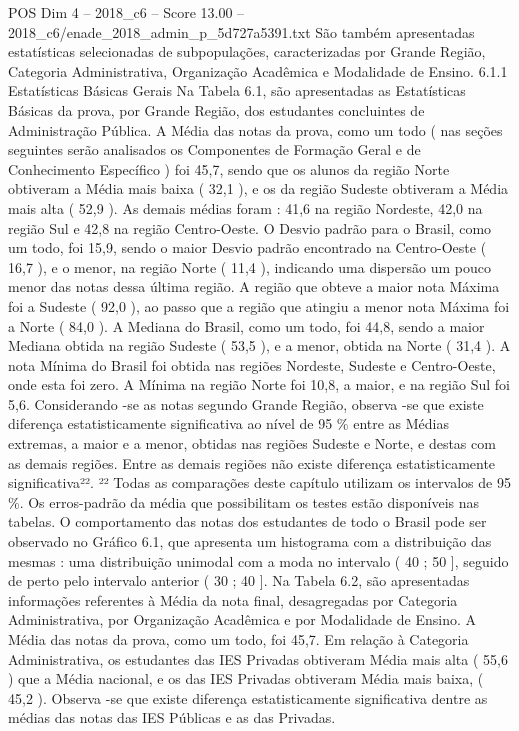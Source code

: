 \begin{textsample}{POS Dim 4 – 2018\_c6 – Score 13.00 – 2018\_c6/enade\_2018\_admin\_p\_5d727a5391.txt}
São também apresentadas estatísticas selecionadas de subpopulações, caracterizadas por Grande Região, Categoria Administrativa, Organização Acadêmica e Modalidade de Ensino. 6.1.1 Estatísticas Básicas Gerais Na Tabela 6.1, são apresentadas as Estatísticas Básicas da prova, por Grande Região, dos estudantes concluintes de Administração Pública.
A Média das notas da prova, como um todo ( nas seções seguintes serão analisados os Componentes de Formação Geral e de Conhecimento Específico ) foi 45,7, sendo que os alunos da região Norte obtiveram a Média mais baixa ( 32,1 ), e os da região Sudeste obtiveram a Média mais alta ( 52,9 ).
As demais médias foram : 41,6 na região Nordeste, 42,0 na região Sul e 42,8 na região Centro-Oeste.
O Desvio padrão para o Brasil, como um todo, foi 15,9, sendo o maior Desvio padrão encontrado na Centro-Oeste ( 16,7 ), e o menor, na região Norte ( 11,4 ), indicando uma dispersão um pouco menor das notas dessa última região.
A região que obteve a maior nota Máxima foi a Sudeste ( 92,0 ), ao passo que a região que atingiu a menor nota Máxima foi a Norte ( 84,0 ).
A Mediana do Brasil, como um todo, foi 44,8, sendo a maior Mediana obtida na região Sudeste ( 53,5 ), e a menor, obtida na Norte ( 31,4 ).
A nota Mínima do Brasil foi obtida nas regiões Nordeste, Sudeste e Centro-Oeste, onde esta foi zero.
A Mínima na região Norte foi 10,8, a maior, e na região Sul foi 5,6.
Considerando -se as notas segundo Grande Região, observa -se que existe diferença estatisticamente significativa ao nível de 95 \% entre as Médias extremas, a maior e a menor, obtidas nas regiões Sudeste e Norte, e destas com as demais regiões.
Entre as demais regiões não existe diferença estatisticamente significativa²². ²² Todas as comparações deste capítulo utilizam os intervalos de 95 \%.
Os erros-padrão da média que possibilitam os testes estão disponíveis nas tabelas.
O comportamento das notas dos estudantes de todo o Brasil pode ser observado no Gráfico 6.1, que apresenta um histograma com a distribuição das mesmas : uma distribuição unimodal com a moda no intervalo ( 40 ; 50 ], seguido de perto pelo intervalo anterior ( 30 ; 40 ].
Na Tabela 6.2, são apresentadas informações referentes à Média da nota final, desagregadas por Categoria Administrativa, por Organização Acadêmica e por Modalidade de Ensino.
A Média das notas da prova, como um todo, foi 45,7.
Em relação à Categoria Administrativa, os estudantes das IES Privadas obtiveram Média mais alta ( 55,6 ) que a Média nacional, e os das IES Privadas obtiveram Média mais baixa, ( 45,2 ).
Observa -se que existe diferença estatisticamente significativa dentre as médias das notas das IES Públicas e as das Privadas.

\end{textsample}
